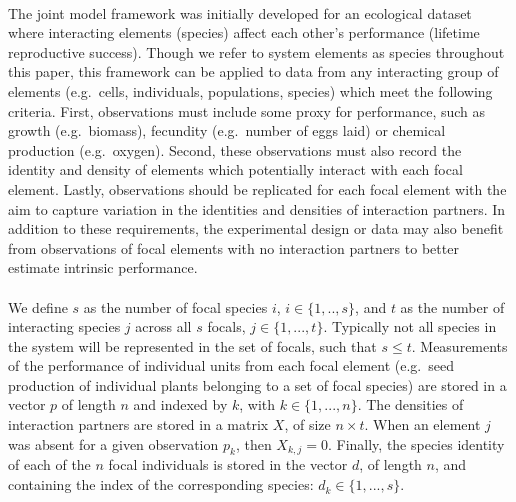 \documentclass[a4,12pt]{article}
\begin{document}
    \paragraph{}
    The joint model framework was initially developed for an ecological dataset where interacting elements (species) affect each other's performance (lifetime reproductive success). Though we refer to system elements as species throughout this paper, this framework can be applied to data from any interacting group of elements (e.g.\ cells, individuals, populations, species) which meet the following criteria. First, observations must include some proxy for performance, such as growth (e.g.\ biomass), fecundity (e.g.\ number of eggs laid) or chemical production (e.g.\ oxygen). Second, these observations must also record the identity and density of elements which potentially interact with each focal element. Lastly, observations should be replicated for each focal element with the aim to capture variation in the identities and densities of interaction partners. In addition to these requirements, the experimental design or data may also benefit from observations of focal elements with no interaction partners to better estimate intrinsic performance. 

    \paragraph{}
    We define $s$ as the number of focal species $i$, $i \in \{ 1, .., s \}$, and $t$ as the number of interacting species $j$ across all $s$ focals, $j \in \{1, ..., t \}$. Typically not all species in the system will be represented in the set of focals, such that $s \le t$. Measurements of the performance of individual units from each focal element (e.g.\ seed production of individual plants belonging to a set of focal species) are stored in a vector $p$ of length $n$ and indexed by $k$, with $k \in \{1, ..., n \}$. The densities of interaction partners are stored in a matrix $X$, of size $n \times t$. When an element $j$ was absent for a given observation $p_k$, then $X_{k,j} = 0$. Finally, the species identity of each of the $n$ focal individuals is stored in the vector $d$, of length $n$, and containing the index of the corresponding species: $d_k \in \{1, ..., s \}$.
\end{document}
